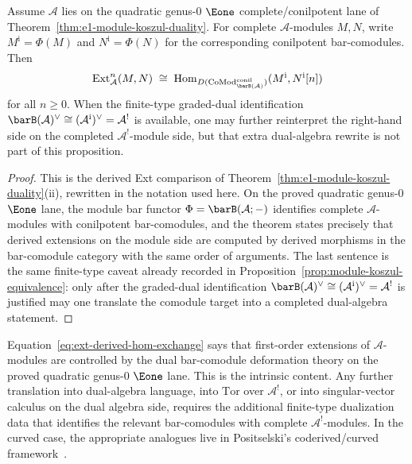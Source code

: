\begin{proposition}
\label{prop:ext-tor-exchange}
Assume $\mathcal{A}$ lies on the quadratic genus-$0$ $\Eone$
complete/conilpotent lane of
Theorem~\ref{thm:e1-module-koszul-duality}. For complete
$\mathcal{A}$-modules $M, N$, write
$M^{\mathrm{i}} = \Phi(M)$ and $N^{\mathrm{i}} = \Phi(N)$ for the corresponding
conilpotent bar-comodules. Then
\begin{equation}\label{eq:ext-derived-hom-exchange}
\mathrm{Ext}^n_{\mathcal{A}}(M, N)
\;\cong\;
\operatorname{Hom}_{D(\mathrm{CoMod}^{\mathrm{conil}}_{\barB(\mathcal{A})})}
(M^{\mathrm{i}}, N^{\mathrm{i}}[n])
\end{equation}
for all $n \ge 0$. When the finite-type graded-dual identification
$\barB(\mathcal{A})^\vee \cong
(\mathcal{A}^{\mathrm{i}})^\vee=\mathcal{A}^!$ is available, one may
further reinterpret the right-hand side on the completed
$\mathcal{A}^!$-module side, but that extra dual-algebra rewrite is
not part of this proposition.
\end{proposition}

\begin{proof}
This is the derived Ext comparison of
Theorem~\ref{thm:e1-module-koszul-duality}(ii), rewritten in the
notation used here. On the proved quadratic
genus-$0$ $\Eone$ lane, the module bar functor
$\Phi=\barB(\mathcal A;-)$ identifies complete
$\mathcal A$-modules with conilpotent bar-comodules, and the theorem
states precisely that derived extensions on the module side are
computed by derived morphisms in the bar-comodule category with the
same order of arguments. The last sentence is the same finite-type caveat already
recorded in Proposition~\ref{prop:module-koszul-equivalence}: only
after the graded-dual identification
$\barB(\mathcal A)^\vee \cong
(\mathcal A^{\mathrm{i}})^\vee=\mathcal A^!$ is justified may one
translate the comodule target into a completed dual-algebra statement.
\end{proof}

\begin{remark}
\label{rem:ext-tor-interpretation}
Equation~\eqref{eq:ext-derived-hom-exchange} says that first-order
extensions of $\mathcal{A}$-modules are controlled by the dual
bar-comodule deformation theory on the proved quadratic genus-$0$
$\Eone$ lane. This is the intrinsic content. Any further
translation into dual-algebra language, into $\mathrm{Tor}$ over
$\mathcal{A}^!$, or into singular-vector calculus on the dual algebra
side, requires the
additional finite-type dualization data that identifies the relevant
bar-comodules with complete $\mathcal{A}^!$-modules. In the curved
case, the appropriate analogues live in Positselski's coderived/curved
framework~\cite{Positselski11}.
\end{remark}


